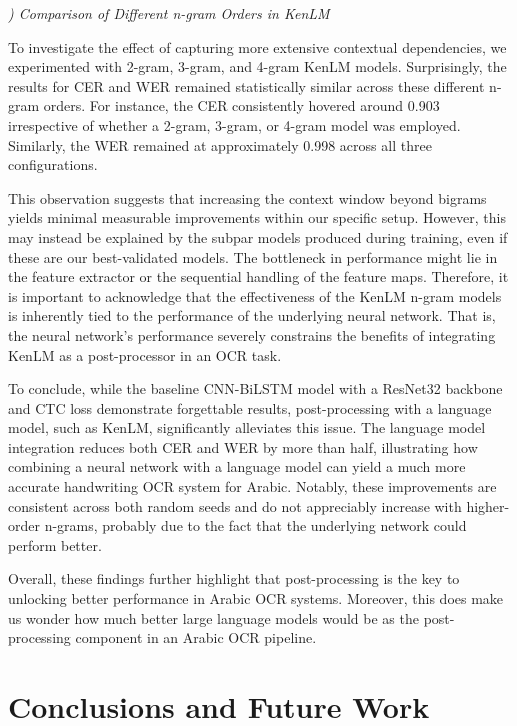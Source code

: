 \documentclass[conference]{IEEEtran}
\newcounter{customsubsubsection} %
\renewcommand{\subsubsection}[1]{%
  \stepcounter{customsubsubsection}%
  \vspace{0.5em} %
  \textit{\arabic{customsubsubsection}) #1}%
  \vspace{0.5em} %
}
\begin{document}
\subsubsection{Comparison of Different n-gram Orders in KenLM}

To investigate the effect of capturing more extensive contextual dependencies, we experimented with 2-gram, 3-gram, and 4-gram KenLM models. Surprisingly, the results for CER and WER remained statistically similar across these different n-gram orders. For instance, the CER consistently hovered around 0.903 irrespective of whether a 2-gram, 3-gram, or 4-gram model was employed. Similarly, the WER remained at approximately 0.998 across all three configurations.

This observation suggests that increasing the context window beyond bigrams yields minimal measurable improvements within our specific setup. However, this may instead be explained by the subpar models produced during training, even if these are our best-validated models. The bottleneck in performance might lie in the feature extractor or the sequential handling of the feature maps. Therefore, it is important to acknowledge that the effectiveness of the KenLM n-gram models is inherently tied to the performance of the underlying neural network. That is, the neural network's performance severely constrains the benefits of integrating KenLM as a post-processor in an OCR task.

To conclude, while the baseline CNN-BiLSTM model with a ResNet32 backbone and CTC loss demonstrate forgettable results, post-processing with a language model, such as KenLM, significantly alleviates this issue. The language model integration reduces both CER and WER by more than half, illustrating how combining a neural network with a language model can yield a much more accurate handwriting OCR system for Arabic. Notably, these improvements are consistent across both random seeds and do not appreciably increase with higher-order n-grams, probably due to the fact that the underlying network could perform better.

Overall, these findings further highlight that post-processing is the key to unlocking better performance in Arabic OCR systems. Moreover, this does make us wonder how much better large language models would be as the post-processing component in an Arabic OCR pipeline. 


\section{Conclusions and Future Work}
\end{document}
